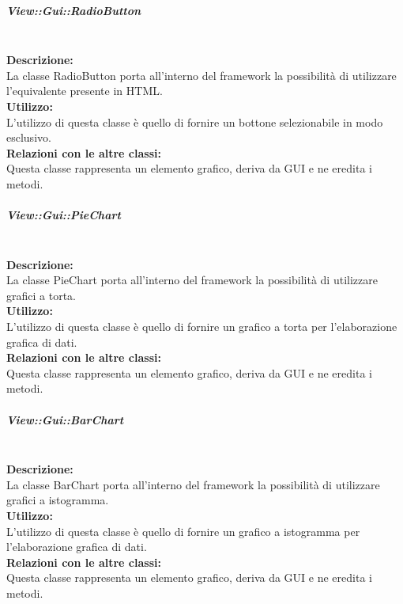 \subparagraph{View\-::Gui\-::Radio\-Button}\label{gui-radio}\mbox{}\\
\textbf{Descrizione:}\\
La classe RadioButton porta all'interno del framework la possibilità di utilizzare l'equivalente presente in HTML.\\
\textbf{Utilizzo:}\\
L'utilizzo di questa classe è quello di fornire un bottone selezionabile in modo esclusivo.\\
\textbf{Relazioni con le altre classi:}\\
Questa classe rappresenta un elemento grafico, deriva da GUI e ne eredita i metodi.

\subparagraph{View\-::Gui\-::Pie\-Chart}\label{gui-pie}\mbox{}\\
\textbf{Descrizione:}\\
La classe PieChart porta all'interno del framework la possibilità di utilizzare grafici a torta.\\
\textbf{Utilizzo:}\\
L'utilizzo di questa classe è quello di fornire un grafico a torta per l'elaborazione grafica di dati.\\
\textbf{Relazioni con le altre classi:}\\
Questa classe rappresenta un elemento grafico, deriva da GUI e ne eredita i metodi.

\subparagraph{View\-::Gui\-::Bar\-Chart}\label{gui-bar}\mbox{}\\
\textbf{Descrizione:}\\
La classe BarChart porta all'interno del framework la possibilità di utilizzare grafici a istogramma.\\
\textbf{Utilizzo:}\\
L'utilizzo di questa classe è quello di fornire un grafico a istogramma per l'elaborazione grafica di dati.\\
\textbf{Relazioni con le altre classi:}\\
Questa classe rappresenta un elemento grafico, deriva da GUI e ne eredita i metodi.